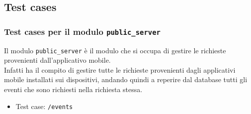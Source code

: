 \documentclass{article}
\begin{document}
\clearpage

\subsection{Test cases}
\subsubsection{Test cases per il modulo \texttt{public\_server}}
Il modulo \texttt{public\_server} è il modulo che si occupa di gestire le richieste provenienti dall'applicativo mobile.\\
Infatti ha il compito di gestire tutte le richieste provenienti dagli applicativi mobile installati sui dispositivi, andando quindi a reperire dal database tutti gli eventi che sono richiesti nella richiesta stessa.\\

\begin{itemize}
    \item Test case: \texttt{/events}
\end{itemize}
\end{document}
